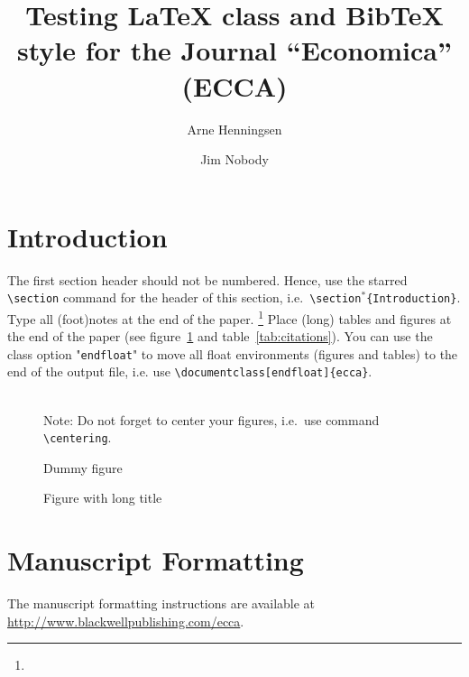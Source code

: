 \documentclass[endfloat]{ecca}
\title{Testing \LaTeX{} class and Bib\TeX{} style for the
   Journal ``Economica'' (ECCA)}
\author{Arne Henningsen \and{} Jim Nobody}
\begin{document}
\maketitle

\begin{abstract}
\end{abstract}

\section*{Introduction}

The first section header should not be numbered.
Hence, use the starred \texttt{\textbackslash{}section} command
for the header of this section,
i.e.\ \texttt{\textbackslash{}section$^*$\{Introduction\}}.
Type all (foot)notes at the end of the paper.%
\footnote{
} 
Place (long) tables and figures at the end of the paper
(see figure~\ref{fig:dummy} and table~\ref{tab:citations}).
You can use the class option "\texttt{endfloat}" to move
all float environments (figures and tables)
to the end of the output file,
i.e. use \texttt{\textbackslash{}documentclass[endfloat]\{ecca\}}.

\begin{figure}[htbp]
\centering
{}
\medskip\\
Note: Do not forget to center your figures,
i.e.\ use command \texttt{\textbackslash{}centering}.
\caption{Dummy figure}
\label{fig:dummy}
\end{figure}

\begin{figure}[htbp]
\centering
{}
\caption{Figure with  long title}
\label{fig:long-title}
\end{figure}


\section{Manuscript Formatting}
The manuscript formatting instructions are available at
\url{http://www.blackwellpublishing.com/ecca}.
\end{document}

